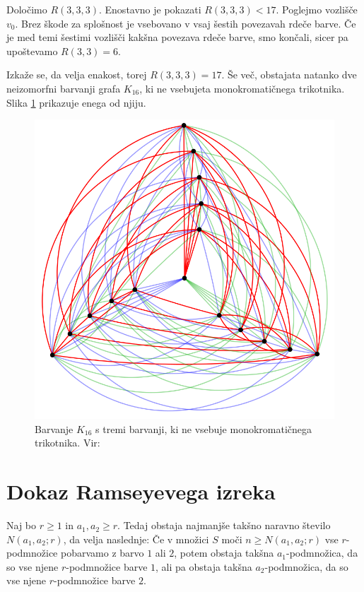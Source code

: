 \documentclass[twoside,11pt]{article}
\begin{document}
\begin{zgled}
    Določimo $R(3, 3, 3)$.
    Enostavno je pokazati $R(3,3,3) < 17$. Poglejmo vozlišče $v_0$. Brez škode za splošnost je vsebovano v vsaj šestih povezavah rdeče 
    barve. Če je med temi šestimi vozlišči kakšna povezava rdeče barve, smo končali, 
    sicer pa upoštevamo $R(3, 3) = 6$.

    Izkaže se, da velja enakost, torej $R(3, 3, 3) = 17$. Še več, obstajata natanko dve 
    neizomorfni barvanji grafa $K_{16}$, ki ne vsebujeta monokromatičnega trikotnika.
    Slika \ref{fig:r333} prikazuje enega od njiju.
    \begin{figure}[h!]
        \centering
        \includegraphics[scale=0.3]{r333.png}
        \caption{Barvanje $K_{16}$ s tremi barvanji, ki ne vsebuje monokromatičnega trikotnika. Vir: \cite{r333}}
        \label{fig:r333}
    \end{figure}
\end{zgled}

\section{Dokaz Ramseyevega izreka}

\begin{izrek}[Ramsey]
    Naj bo $r \ge 1$ in $a_1, a_2 \ge r$. Tedaj obstaja najmanjše takšno naravno število 
    $N(a_1, a_2; r)$, da velja naslednje: Če v množici $S$ moči $n \ge N(a_1, a_2; r)$
    vse $r$-podmnožice pobarvamo z barvo $1$ ali $2$, potem obstaja takšna $a_1$-podmnožica, 
    da so vse njene $r$-podmnožice barve $1$, ali pa obstaja takšna $a_2$-podmnožica, da so 
    vse njene $r$-podmnožice barve $2$. \label{izrek:ramsey}
\end{izrek}
\end{document}
